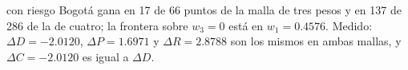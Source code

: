{con riesgo Bogotá gana en 17 de 66 puntos de la malla de tres pesos y en 137 de 286 de la de cuatro; la frontera sobre $w_3=0$ está en $w_1 = 0.4576$.}
{Medido: $\Delta D = -2.0120$, $\Delta P = 1.6971$ y $\Delta R = 2.8788$ son los mismos en ambas mallas, y $\Delta C = -2.0120$ es igual a $\Delta D$.}
